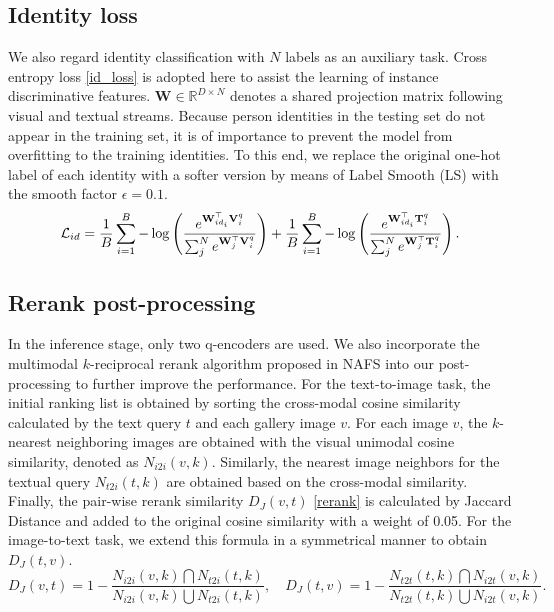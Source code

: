 \documentclass{bmvc2k}
\begin{document}
\subsection{Identity loss} We also regard identity classification with $N$ labels as an auxiliary task. Cross entropy loss \ref{id_loss} is adopted here to assist the learning of instance discriminative features. $\mathbf{W} \in \mathbb{R}^{D\times N}$ denotes a shared projection matrix following visual and textual streams. Because
person identities in the testing set do not appear in the training set, it is of importance to prevent the model from overfitting to the training identities. To this end, we replace the original one-hot label of each identity with a softer version by means of Label Smooth (LS) \cite{szegedy2016ls, luo2019strong}  with the smooth factor $\epsilon=0.1$.
\begin{equation}
\label{id_loss}
\small
\mathcal{L}_{id}=\frac{1}{B} \sum_{i=1}^{B}-\log \left(\frac{e^{ \mathbf{W}_{id_{i}}^{\top} \mathbf{V}_{i}^q}}{\sum_{j}^N e^{\mathbf{W}_{j}^{\top} \mathbf{V}_{i}^q}}\right) + \frac{1}{B} \sum_{i=1}^{B}-\log \left(\frac{e^{ \mathbf{W}_{id_{i}}^{\top} \mathbf{T}_{i}^q}}{\sum_{j}^N e^{\mathbf{W}_{j}^{\top} \mathbf{T}_{i}^q}}\right).
\end{equation}

\subsection{Rerank post-processing} In the inference stage, only two q-encoders are used. We also incorporate the multimodal $k$-reciprocal rerank algorithm proposed in NAFS \cite{gao2021contextual} into our post-processing to further improve the performance. For the text-to-image task, the initial ranking list is obtained by sorting the cross-modal cosine similarity calculated by the text query $t$ and each gallery image $v$. For each image $v$, the $k$-nearest neighboring images are obtained with the visual unimodal cosine similarity, denoted as $N_{i2i}(v, k)$. Similarly, the nearest image neighbors for the textual query $N_{t2i}(t, k)$ are obtained based on the cross-modal similarity. Finally, the pair-wise rerank similarity $D_J(v, t)$ \ref{rerank} is calculated by Jaccard Distance and added to the original cosine similarity with a weight of 0.05. For the image-to-text task, we extend this formula in a symmetrical manner to obtain $D_J(t, v)$.
\begin{equation}
\label{rerank}
D_{J}(v, t)=1-\frac{N_{i 2 i}(v, k) \bigcap N_{t 2 i}(t, k)}{N_{i 2 i}(v, k) \bigcup N_{t 2 i}(t, k)},\quad D_{J}(t, v)=1-\frac{N_{t 2 t}(t, k) \bigcap N_{i 2 t}(v, k)}{N_{t 2 t}(t, k) \bigcup N_{i 2 t}(v, k)}.
\end{equation}
\end{document}
